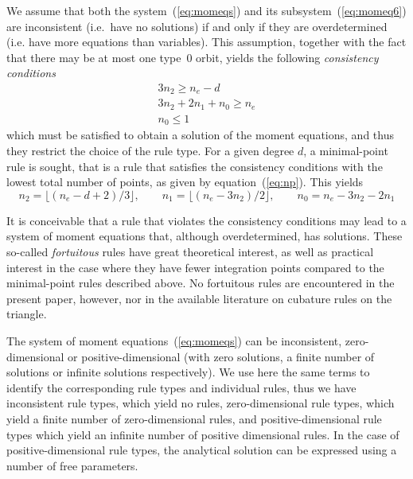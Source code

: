 \documentclass{article}
\begin{document}
We assume that both the system~(\ref{eq:momeqs}) and its subsystem~(\ref{eq:momeq6}) are inconsistent (i.e.\ have no solutions) if and only if they are overdetermined (i.e. have more equations than variables). This assumption, together with the fact that there may be at most one type~0 orbit, yields the following \emph{consistency conditions}
\begin{subequations}
\begin{gather}
  3 n_2 \geq n_e - d \\
  3 n_2 + 2 n_1 + n_0 \geq n_e \\
  n_0 \leq 1
\end{gather}
\end{subequations}
which must be satisfied to obtain a solution of the moment equations, and thus they restrict the choice of the rule type. For a given degree $d$, a minimal-point rule is sought, that is a rule that satisfies the consistency conditions with the lowest total number of points, as given by equation~(\ref{eq:np}). This yields
\begin{equation}
  n_2 = \big\lfloor (n_e - d + 2)/3 \big\rfloor
  ,\qquad
  n_1 = \big\lfloor (n_e - 3 n_2)/2 \big\rfloor
  ,\qquad
  n_0 = n_e - 3 n_2 - 2 n_1
\end{equation}


It is conceivable that a rule that violates the consistency conditions may lead to a system of moment equations that, although overdetermined, has solutions. These so-called \emph{fortuitous} rules have great theoretical interest, as well as practical interest in the case where they have fewer integration points compared to the minimal-point rules described above. No fortuitous rules are encountered in the present paper, however, nor in the available literature on cubature rules on the triangle.

The system of moment equations~(\ref{eq:momeqs}) can be inconsistent, zero-dimensional or positive-dimensional (with zero solutions, a finite number of solutions or infinite solutions respectively). We use here the same terms to identify the corresponding rule types and individual rules, thus we have inconsistent rule types, which yield no rules, zero-dimensional rule types, which yield a finite number of zero-dimensional rules, and  positive-dimensional rule types which yield an infinite number of positive dimensional rules. In the case of positive-dimensional rule types, the analytical solution can be expressed using a number of free parameters.
\end{document}
